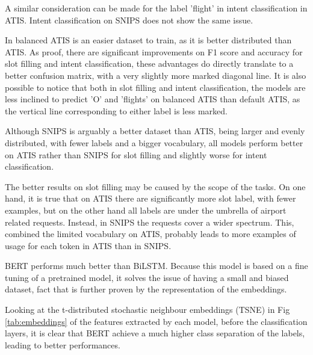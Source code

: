 \documentclass[a4paper]{article}
\begin{document}
A similar consideration can be made for the label 'flight' in intent classification in ATIS. Intent classification on SNIPS does not show the same issue. 

In balanced ATIS is an easier dataset to train, as it is better distributed than ATIS. As proof, there are significant improvements on F1 score and accuracy for slot filling and intent classification, these advantages do directly translate to a better confusion matrix, with a very slightly more marked diagonal line.
It is also possible to notice that both in slot filling and intent classification, the models are less inclined to predict 'O' and 'flights' on balanced ATIS than default ATIS, as the vertical line corresponding to either label is less marked. 

Although SNIPS is arguably a better dataset than ATIS, being larger and evenly distributed, with fewer labels and a bigger vocabulary, all models perform better on ATIS rather than SNIPS for slot filling and slightly worse for intent classification. 

The better results on slot filling may be caused by the scope of the tasks. 
On one hand, it is true that on ATIS there are significantly more slot label, with fewer examples, but on the other hand all labels are under the umbrella of airport related requests. Instead, in SNIPS the requests cover a wider spectrum. This, combined the limited vocabulary on ATIS, probably leads to more examples of usage for each token in ATIS than in SNIPS.


BERT performs much better than BiLSTM. Because this model is based on a fine tuning of a pretrained model, it solves the issue of having a small and biased dataset, fact that is further proven by the representation of the embeddings. 

Looking at the t-distributed stochastic neighbour embeddings (TSNE) in Fig \ref{tab:embeddings} of the features extracted by each model, before the classification layers, it is clear that BERT achieve a much higher class separation of the labels, leading to better performances. 
\end{document}
